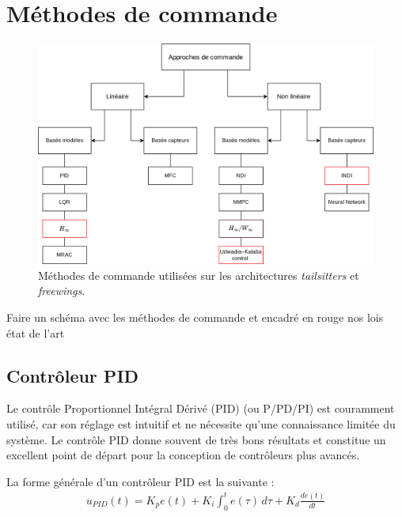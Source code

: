 \section{Méthodes de commande}
\begin{figure}[ht!]
    \centerline{
    \includegraphics[trim=0cm 0cm 0cm 0cm,clip,width=0.8\columnwidth]{figures/controle_methode.png}}
    \caption{Méthodes de commande utilisées sur les architectures \textit{tailsitters} et \textit{freewings}.}
    \label{fig:methodecmd}
\end{figure}

Faire un schéma avec les méthodes de commande et encadré en rouge nos lois
état de l'art

\subsection*{Contrôleur PID}
Le contrôle Proportionnel Intégral Dérivé (PID) (ou P/PD/PI) est couramment utilisé, car son réglage est intuitif et ne nécessite qu'une connaissance limitée du système. Le contrôle PID donne souvent de très bons résultats et constitue un excellent point de départ pour la conception de contrôleurs plus avancés.

La forme générale d'un contrôleur PID est la suivante :
\begin{align}
    u_{PID}(t) = K_{p} e(t) + K_{i} \int_{0}^{t} e(\tau) \,d\tau + K_{d} \frac{d e(t)}{dt}
\end{align}
